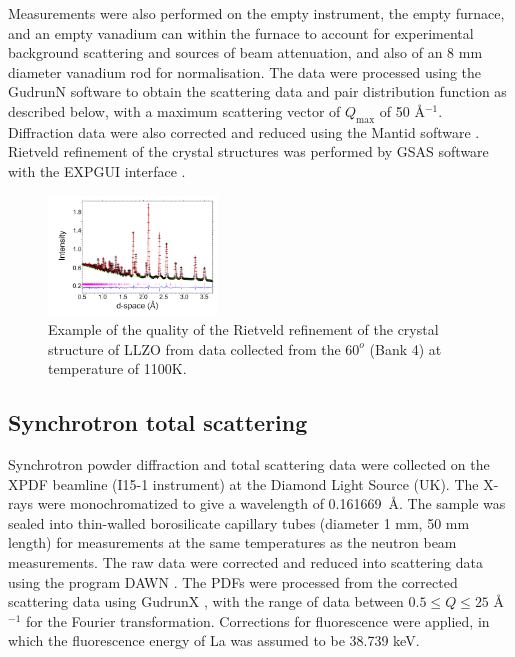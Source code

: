 \documentclass[twoside,twocolumn,9pt]{article}
\begin{document}
Measurements were also performed on the empty instrument, the empty furnace, and an empty vanadium can within the furnace to account for experimental background scattering and sources of beam attenuation, and also of an 8 mm diameter vanadium rod for normalisation. The data were processed using the GudrunN software \cite{Soper:2012vs} to obtain the scattering data and pair distribution function as described below, with a maximum scattering vector of $Q_\mathrm{max}$ of 50 \AA$^{-1}$. Diffraction data were also corrected and reduced using the Mantid software \cite{Arnold:2014iy}. Rietveld refinement of the crystal structures was performed by GSAS software \cite{Larson:2004wv} with the EXPGUI interface \cite{gsasgui}.

\begin{figure}[t]
\begin{center}
\includegraphics[width=0.4\textwidth]{Pics/1100KBank4v03.pdf}
\caption{Example of the quality of the Rietveld refinement of the crystal structure
 of LLZO from data collected from the $60^o$ (Bank 4) at temperature of 1100K.}
\label{fig:gsas}
\end{center}
\end{figure}


\subsection{Synchrotron total scattering}
Synchrotron powder diffraction and total scattering data were collected on the XPDF beamline (I15-1 instrument) at the Diamond Light Source (UK).
The X-rays were monochromatized to give a wavelength of 0.161669~\AA.
The sample was sealed into thin-walled borosilicate capillary tubes (diameter 1 mm, 50 mm length) for measurements at the same temperatures as the neutron beam measurements. The raw data  were corrected and reduced into scattering data using the program DAWN \cite{Basham:2015cf}.
The PDFs were processed from the corrected scattering data using GudrunX \cite{Soper:2011fda,Soper:2012vs}, with the range of data between $0.5 \le Q \le 25$ \AA$^{-1}$ for the Fourier transformation. Corrections for fluorescence were applied, in which the fluorescence energy of La was assumed to be 38.739 keV.
\end{document}
